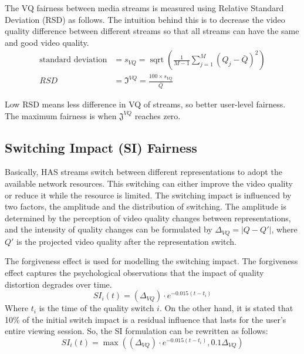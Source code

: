 \documentclass[12pt]{article}
\begin{document}
The VQ fairness between media streams is measured using Relative Standard Deviation (RSD) as follows. The intuition behind this is to decrease the video quality difference between different streams so that all streams can have the same and good video quality.
\begin{equation}
\begin{aligned}
\text{standard deviation} &=s_{V Q}=\operatorname{sqrt}\left(\frac{1}{M-1} \sum_{j=1}^{M}\left(Q_{j}-\bar{Q}\right)^{2}\right) \\
RSD &=\mathfrak{I}^{V Q}=\frac{100 \times s_{V Q}}{\bar{Q}}
\end{aligned}
\end{equation}

Low RSD means less difference in VQ of streams, so better user-level fairness. The maximum fairness is when $\mathfrak{J}^{V Q}$ reaches zero.

\subsection{Switching Impact (SI) Fairness}
Basically, HAS streams switch between different representations to adopt the available network resources. This switching can either improve the video quality or reduce it while the resource is limited. The switching impact is influenced by two factors, the amplitude and the distribution of switching. The amplitude is determined by the perception of video quality changes between representations, and the intensity of quality changes can be formulated by $\Delta_{V Q}=|Q-Q\prime|$, where $Q\prime$ is the projected video quality after the representation switch.

The forgiveness effect is used for modelling the switching impact. The forgiveness effect captures the psychological observations that the impact of quality distortion degrades over time.
\begin{equation}
S I_{i}(t)=\left(\Delta_{V Q}\right) \cdot e^{-0.015\left(t-t_{i}\right)}
\end{equation}
Where $t_i$ is the time of the quality switch $i$. 
On the other hand, it is stated that 10\% of the initial switch impact is a residual influence that lasts for the user’s entire viewing session. So, the SI formulation can be rewritten as follows:
\begin{equation}
S I_{i}(t)=\max \left(\left(\Delta_{V Q}\right) \cdot e^{-0.015\left(t-t_{i}\right)}, 0.1 \Delta_{V Q}\right)
\end{equation}
\end{document}
